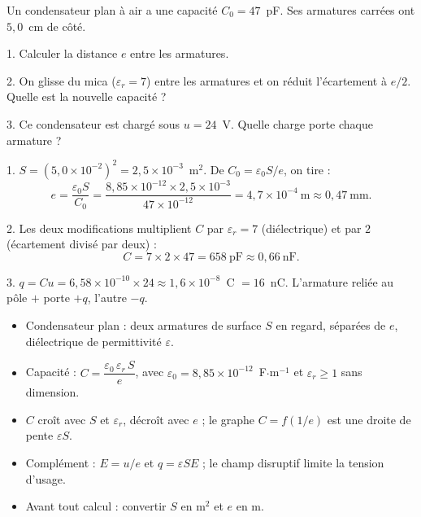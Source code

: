 \documentclass[11pt]{article}
\begin{document}
\begin{exercice}
Un condensateur plan à air a une capacité $C_0 = 47$~pF. Ses armatures carrées ont $5{,}0$~cm de côté.

1. Calculer la distance $e$ entre les armatures.

2. On glisse du mica ($\varepsilon_r = 7$) entre les armatures et on réduit l'écartement à $e/2$. Quelle est la nouvelle capacité ?

3. Ce condensateur est chargé sous $u = 24$~V. Quelle charge porte chaque armature ?
\end{exercice}

\begin{corrige}
1. $S = (5{,}0\times 10^{-2})^2 = 2{,}5\times 10^{-3}$~m$^2$. De $C_0 = \varepsilon_0 S/e$, on tire :
\[ e = \dfrac{\varepsilon_0 S}{C_0} = \dfrac{8{,}85\times 10^{-12}\times 2{,}5\times 10^{-3}}{47\times 10^{-12}} = 4{,}7\times 10^{-4}\ \mathrm{m} \approx 0{,}47\ \mathrm{mm}. \]

2. Les deux modifications multiplient $C$ par $\varepsilon_r = 7$ (diélectrique) et par $2$ (écartement divisé par deux) :
\[ C = 7\times 2\times 47 = 658\ \mathrm{pF} \approx 0{,}66\ \mathrm{nF}. \]

3. $q = Cu = 6{,}58\times 10^{-10}\times 24 \approx 1{,}6\times 10^{-8}$~C $= 16$~nC. L'armature reliée au pôle $+$ porte $+q$, l'autre $-q$.
\end{corrige}

\begin{aretenir}
\begin{itemize}
\item Condensateur plan : deux armatures de surface $S$ en regard, séparées de $e$, diélectrique de permittivité $\varepsilon$.
\item Capacité : $C = \dfrac{\varepsilon_0\,\varepsilon_r\, S}{e}$, avec $\varepsilon_0 = 8{,}85\times 10^{-12}$~F$\cdot$m$^{-1}$ et $\varepsilon_r \geq 1$ sans dimension.
\item $C$ croît avec $S$ et $\varepsilon_r$, décroît avec $e$ ; le graphe $C = f(1/e)$ est une droite de pente $\varepsilon S$.
\item Complément : $E = u/e$ et $q = \varepsilon S E$ ; le champ disruptif limite la tension d'usage.
\item Avant tout calcul : convertir $S$ en m$^2$ et $e$ en m.
\end{itemize}
\end{aretenir}
\end{document}
